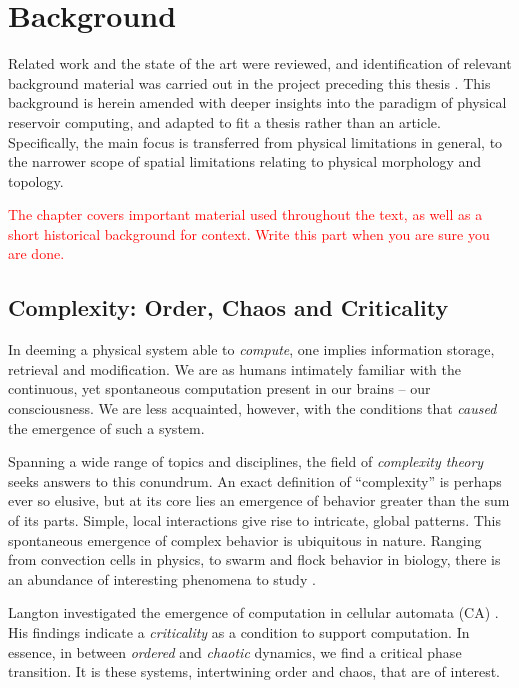 \chapter{Background}
\label{ch:background}


Related work and the state of the art were reviewed, and identification of
relevant background material was carried out in the project preceding this
thesis \cite{aven_exploring_2019}. This background is herein amended with deeper
insights into the paradigm of physical reservoir computing, and adapted to fit a
thesis rather than an article. Specifically, the main focus is transferred from
physical limitations in general, to the narrower scope of spatial limitations
relating to physical morphology and topology.

\textcolor{red}{
  The chapter covers important material used throughout the text, as well as a
short historical background for context. Write this part when you are sure you
are done.
}

\section{Complexity: Order, Chaos and Criticality}
\label{sec:criticality}

In deeming a physical system able to \textit{compute}, one implies information
storage, retrieval and modification. We are as humans intimately familiar with
the continuous, yet spontaneous computation present in our brains -- our
consciousness. We are less acquainted, however, with the conditions that
\textit{caused} the emergence of such a system.

Spanning a wide range of topics and disciplines, the field of \textit{complexity
theory} seeks answers to this conundrum. An exact definition of ``complexity''
is perhaps ever so elusive, but at its core lies an emergence of behavior
greater than the sum of its parts. Simple, local interactions give rise to
intricate, global patterns. This spontaneous emergence of complex behavior is
ubiquitous in nature. Ranging from convection cells in physics, to swarm and
flock behavior in biology, there is an abundance of interesting phenomena to
study \cite{heylighen_science_1999-1}.

Langton investigated the emergence of computation in cellular automata (CA)
\cite{langton_computation_1990}. His findings indicate a \textit{criticality} as
a condition to support computation. In essence, in between \textit{ordered} and
\textit{chaotic} dynamics, we find a critical phase transition. It is these
systems, intertwining order and chaos, that are of interest.

